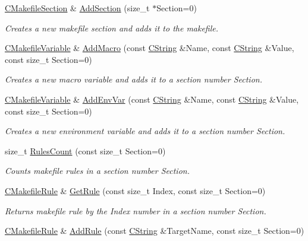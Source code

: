 \begin{DoxyCompactItemize}
\hyperlink{classCMakefileSection}{C\-Makefile\-Section} \& \hyperlink{classCMakefile_ab70e6833a96f4fe07ffefd5a26760e8e}{Add\-Section} (size\-\_\-t $\ast$Section=0)
\begin{DoxyCompactList}\small\item\em Creates a new makefile section and adds it to the makefile. \end{DoxyCompactList}\item 
\hyperlink{classCMakefileVariable}{C\-Makefile\-Variable} \& \hyperlink{classCMakefile_ab9d54996fca8732018b5b3a4458c413d}{Add\-Macro} (const \hyperlink{classCString}{C\-String} \&Name, const \hyperlink{classCString}{C\-String} \&Value, const size\-\_\-t Section=0)
\begin{DoxyCompactList}\small\item\em Creates a new macro variable and adds it to a section number {\itshape Section}. \end{DoxyCompactList}\item 
\hyperlink{classCMakefileVariable}{C\-Makefile\-Variable} \& \hyperlink{classCMakefile_a08f58986e9d5ec826d2f14c9f514d1dd}{Add\-Env\-Var} (const \hyperlink{classCString}{C\-String} \&Name, const \hyperlink{classCString}{C\-String} \&Value, const size\-\_\-t Section=0)
\begin{DoxyCompactList}\small\item\em Creates a new environment variable and adds it to a section number {\itshape Section}. \end{DoxyCompactList}\item 
size\-\_\-t \hyperlink{classCMakefile_ac10c900fc4a140c4b5fc40c97251ddce}{Rules\-Count} (const size\-\_\-t Section=0)
\begin{DoxyCompactList}\small\item\em Counts makefile rules in a section number {\itshape Section}. \end{DoxyCompactList}\item 
\hyperlink{classCMakefileRule}{C\-Makefile\-Rule} \& \hyperlink{classCMakefile_a28cffd998a6294be6adea7d2f486b5a2}{Get\-Rule} (const size\-\_\-t Index, const size\-\_\-t Section=0)
\begin{DoxyCompactList}\small\item\em Returns makefile rule by the {\itshape Index} number in a section number {\itshape Section}. \end{DoxyCompactList}\item 
\hyperlink{classCMakefileRule}{C\-Makefile\-Rule} \& \hyperlink{classCMakefile_a94a25d457e0a5dcf9eb6b06796017e11}{Add\-Rule} (const \hyperlink{classCString}{C\-String} \&Target\-Name, const size\-\_\-t Section=0)

\end{DoxyCompactItemize}
